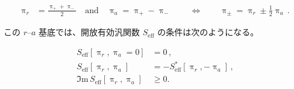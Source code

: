 \documentclass[a4paper,11pt]{ltjsarticle}
\numberwithin{equation}{section}
\def\uppia{\uppi_{a}}
\def\uppir{\uppi_{r}}
\newcommand{\Ima}{\Im \mathrm{m}\,}
\begin{document}
\begin{align}\label{eq:basis}
 \uppi_r &= \frac{\uppi_+ + \uppi_-}{2} \quad \mathrm{and} \quad \uppi_a = \uppi_+ - \uppi_-\, \qquad \Leftrightarrow \qquad  \uppi_\pm =\uppir\pm \frac12 \uppia\,.
\end{align}

この $r$--$a$ 基底では、開放有効汎関数 $S_{\mathrm{eff}}$ の条件は次のようになる。

\begin{align}
S_{\mathrm{eff}} \left[\uppi_r,\uppi_a = 0\right] &= 0 \,,\label{eq:norm} \\
S_{\mathrm{eff}} \left[\uppi_r,\uppi_a\right] &= - 	S^*_{\mathrm{eff}} \left[\uppi_r,-\uppi_a\right] \,,\label{eq:herm} \\
\Ima S_{\mathrm{eff}} \left[\uppi_r,\uppi_a\right] &\geq 0. \label{eq:pos}
\end{align}
\end{document}
